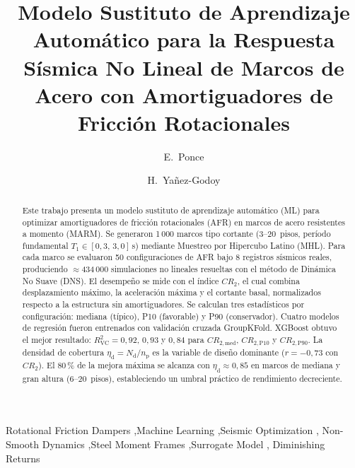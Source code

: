 \documentclass[preprint,12pt,authoryear]{elsarticle}
\newcommand{\CR}[1]{CR_{2,\text{#1}}}
\newcommand{\Rsq}{R^{2}_{\mathrm{VC}}}
\newcommand{\nd}{N_{\mathrm{d}}}
\newcommand{\np}{n_{\mathrm{p}}}
\newcommand{\etad}{\eta_{\mathrm{d}}}
\begin{document}
\begin{frontmatter}

\title{Modelo Sustituto de Aprendizaje Automático para la Respuesta Sísmica
       No Lineal de Marcos de Acero con Amortiguadores de Fricción Rotacionales}

\author[uaq]{E.~Ponce}
\author[i2m]{H.~Yañez-Godoy}

\address[uaq]{Universidad Autónoma de Querétaro, Facultad de Ingeniería,
              Cerro de las Campanas s/n, Querétaro, México}
\address[i2m]{Arts et Metiers Institute of Technology, University of Bordeaux,
              Centre National de la Recherche Scientifique (CNRS),
              Bordeaux INP, I2M, UMR 5295, 33400 Talence, France}

\begin{abstract}
Este trabajo presenta un modelo sustituto de aprendizaje automático (ML) para
optimizar amortiguadores de fricción rotacionales (AFR) en marcos
de acero resistentes a momento (MARM). Se generaron 1\,000 marcos tipo cortante
(3--20~pisos, período fundamental $T_1 \in [0{,}3,\,3{,}0]$\,s) mediante
Muestreo por Hipercubo Latino (MHL). Para cada marco se evaluaron 50
configuraciones de AFR bajo 8 registros sísmicos reales, produciendo
$\approx$434\,000 simulaciones no lineales resueltas con el método de Dinámica
No Suave (DNS). El desempeño se mide con el índice $CR_2$, el cual combina 
desplazamiento máximo, la aceleración máxima y el cortante basal,
normalizados respecto a la estructura sin amortiguadores. Se calculan tres
estadísticos por configuración: mediana (típico), P10 (favorable) y P90
(conservador). Cuatro modelos de regresión fueron entrenados con validación
cruzada GroupKFold. XGBoost obtuvo el mejor resultado: $\Rsq = 0{,}92$,
$0{,}93$ y $0{,}84$ para $\CR{med}$, $\CR{P10}$ y $\CR{P90}$.
La densidad de cobertura $\etad = \nd/\np$ es la variable de diseño dominante
($r=-0{,}73$ con $CR_2$). El 80\,\% de la mejora máxima se alcanza con
$\etad \approx 0{,}85$ en marcos de mediana y gran altura (6--20~pisos),
estableciendo un umbral práctico de rendimiento decreciente.
\end{abstract}

\begin{keyword}
Rotational Friction Dampers \sep Machine Learning \sep Seismic Optimization \sep
Non-Smooth Dynamics \sep Steel Moment Frames \sep Surrogate Model \sep
Diminishing Returns
\end{keyword}

\end{frontmatter}
\end{document}
